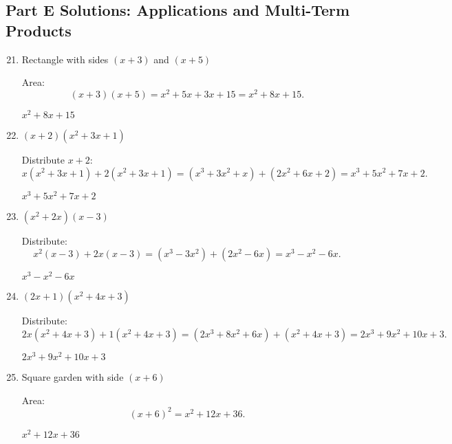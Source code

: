 \documentclass[12pt]{article}
\begin{document}
\subsection*{Part E Solutions: Applications and Multi-Term Products}
\begin{enumerate}
  \setcounter{enumi}{20}
  \item Rectangle with sides \((x + 3)\) and \((x + 5)\)

  Area:
  \[
  (x + 3)(x + 5)
  = x^2 + 5x + 3x + 15
  = x^2 + 8x + 15.
  \]

  \(\boxed{x^2 + 8x + 15}\)

  \item \((x + 2)(x^2 + 3x + 1)\)

  Distribute \(x + 2\):
  \[
  x(x^2 + 3x + 1) + 2(x^2 + 3x + 1)
  = (x^3 + 3x^2 + x) + (2x^2 + 6x + 2)
  = x^3 + 5x^2 + 7x + 2.
  \]

  \(\boxed{x^3 + 5x^2 + 7x + 2}\)

  \item \((x^2 + 2x)(x - 3)\)

  Distribute:
  \[
  x^2(x - 3) + 2x(x - 3)
  = (x^3 - 3x^2) + (2x^2 - 6x)
  = x^3 - x^2 - 6x.
  \]

  \(\boxed{x^3 - x^2 - 6x}\)

  \item \((2x + 1)(x^2 + 4x + 3)\)

  Distribute:
  \[
  2x(x^2 + 4x + 3) + 1(x^2 + 4x + 3)
  = (2x^3 + 8x^2 + 6x) + (x^2 + 4x + 3)
  = 2x^3 + 9x^2 + 10x + 3.
  \]

  \(\boxed{2x^3 + 9x^2 + 10x + 3}\)

  \item Square garden with side \((x + 6)\)

  Area:
  \[
  (x + 6)^2 = x^2 + 12x + 36.
  \]

  \(\boxed{x^2 + 12x + 36}\)
\end{enumerate}
\end{document}
